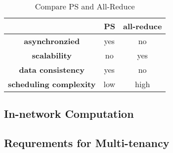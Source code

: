 \begin{table}[htb]
\caption{Compare PS and All-Reduce}

\begin{tabular}{|c|c|c|}
\hline
\multicolumn{1}{|r|}{}         & \multicolumn{1}{r|}{\textbf{PS}} & \multicolumn{1}{r|}{\textbf{all-reduce}} \\ \hline
\textbf{asynchronzied}         & yes                              & no                                       \\ \hline
\textbf{scalability}           & no                               & yes                                      \\ \hline
\textbf{data consistency}      & yes                              & no                                       \\ \hline
\textbf{scheduling complexity} & low                              & high                                     \\ \hline
\end{tabular}
\end{table}

\subsection{In-network Computation}
\subsection{Requrements for Multi-tenancy}
















